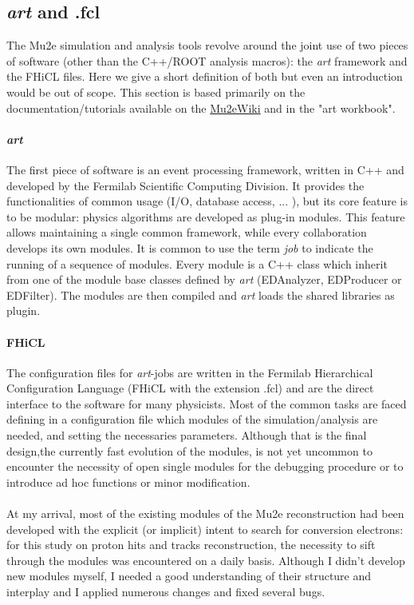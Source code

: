 \documentclass[12pt,a4paper,openright, oneside, titlepage]{book} %
\begin{document}
\subsection{\textit{art} and .fcl}
The Mu2e simulation and analysis tools revolve around the joint use of two pieces of software (other than the C++/ROOT analysis macros): the \textit{art} framework and the FHiCL files. Here we give a short definition of both but even an introduction would be out of scope. This section is based primarily on the documentation/tutorials available on the  \href{https://mu2ewiki.fnal.gov/}{Mu2eWiki} and in the "art workbook"\cite{art}.

\paragraph{\textit{art}} The first piece of software is an event processing framework, written in C++ and developed by the Fermilab Scientific Computing Division. It provides the functionalities of common usage (I/O, database access, ... ), but its core feature is to be modular: physics algorithms are developed as plug-in modules. 
This feature allows maintaining a single common framework, while every collaboration develops its own modules. 
It is common to use the term \textit{job} to indicate the running of a sequence of modules.   
Every module is a C++ class which inherit from one of the module base classes defined by \textit{art} (EDAnalyzer, EDProducer or EDFilter). The modules are then compiled and \textit{art} loads the shared libraries as plugin.

\paragraph{FHiCL} The configuration files for \textit{art}-jobs are written in the Fermilab Hierarchical Configuration Language (FHiCL with the extension .fcl) and are the direct interface to the software for many physicists. 
Most of the common tasks are faced defining in a configuration file which modules of the simulation/analysis are needed, and setting the necessaries parameters. 
Although that is the final design,the
currently fast evolution of the modules, is not yet uncommon to encounter the necessity of open single modules for the debugging procedure or to introduce ad hoc functions or minor modification.\\ \\
At my arrival, most of the existing modules of the Mu2e reconstruction had been developed with the explicit (or implicit) intent to search for conversion electrons: for this study on proton hits and tracks reconstruction, the necessity to sift through the modules was encountered on a daily basis. 
Although I didn't develop new modules myself, I needed a good understanding of their structure and interplay and I applied numerous changes and fixed several bugs.
\end{document}
